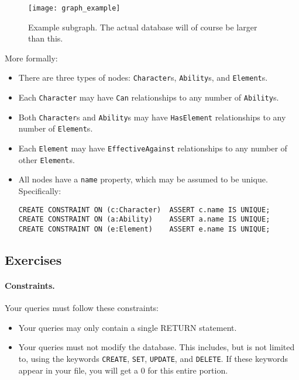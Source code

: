 \documentclass[10pt]{article}
\begin{document}
\begin{figure}[h]
	\centering
	\texttt{[image: graph\_example]}
	\caption{Example subgraph. The actual database will of course be larger than this.}
	\label{fig:graph}
\end{figure}

More formally:
\begin{itemize}
	\item There are three types of nodes: \texttt{Character}s, \texttt{Ability}s, and \texttt{Element}s. 
	\item Each \texttt{Character} may have \texttt{Can} relationships to any number of \texttt{Ability}s.
	\item Both \texttt{Character}s and  \texttt{Ability}s may have \texttt{HasElement} relationships to any number of \texttt{Element}s.
	\item Each \texttt{Element} may have \texttt{EffectiveAgainst} relationships to any number of other \texttt{Element}s.
	\item All nodes have a \texttt{name} property, which may be assumed to be unique. Specifically:
\begin{verbatim}
CREATE CONSTRAINT ON (c:Character)  ASSERT c.name IS UNIQUE;
CREATE CONSTRAINT ON (a:Ability)    ASSERT a.name IS UNIQUE;
CREATE CONSTRAINT ON (e:Element)    ASSERT e.name IS UNIQUE;
\end{verbatim}
\end{itemize}

\subsection{Exercises}

\paragraph{Constraints.}

Your queries must follow these constraints:

\begin{itemize}
	\item Your queries may only contain a single RETURN statement.
	\item Your queries must not modify the database. This includes, but is not limited to, using the keywords \texttt{CREATE}, \texttt{SET}, \texttt{UPDATE}, and \texttt{DELETE}. If these keywords appear in your file, you will get a 0 for this entire portion.
\end{itemize}
\end{document}
